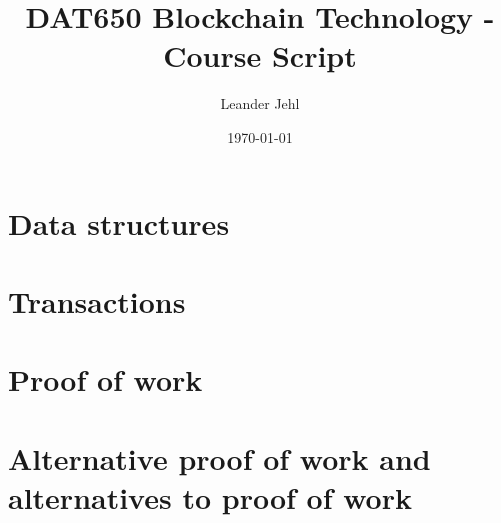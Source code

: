 \documentclass[a4paper,11pt]{report}
\begin{document}
	\title{DAT650 Blockchain Technology - Course Script}
	\author{Leander Jehl}
	\date{\today}
	
	\maketitle

\chapter{Data structures}
	






\chapter{Transactions}



\chapter{Proof of work}



\chapter{Alternative proof of work and alternatives to proof of work}
\end{document}
